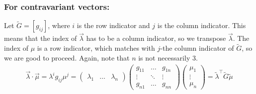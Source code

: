 \documentclass{book}
\theoremstyle{definition}
\begin{document}
\subsubsection{For contravariant vectors:}
Let $\tilde{G} = [g_{ij}]$, where $i$ is the row indicator and $j$ is the column indicator. This means that the index of $\vec{\lambda}$ has to be a column indicator, so we transpose $\vec{\lambda}$. The index of $\mu$ is a row indicator, which matches with $j$-the column indicator of $\tilde{G}$, so we are good to proceed. Again, note that $n$ is not necessarily 3.  
\begin{align*}
\boxed{
\vec{\lambda}\cdot\vec{\mu} = 
\lambda^ig_{ij}\mu^j
=
\begin{pmatrix}
\lambda_1 & \dots & \lambda_n
\end{pmatrix}
\begin{pmatrix}
g_{11} & \dots & g_{1n}\\
\vdots & \ddots & \vdots \\
g_{n1} & \dots & g_{nn}
\end{pmatrix}
\begin{pmatrix}
\mu_1 \\
\vdots\\
\mu_n
\end{pmatrix}
=
\tilde{\lambda}^\top \tilde{G} \tilde{\mu}}
\end{align*}
\end{document}
